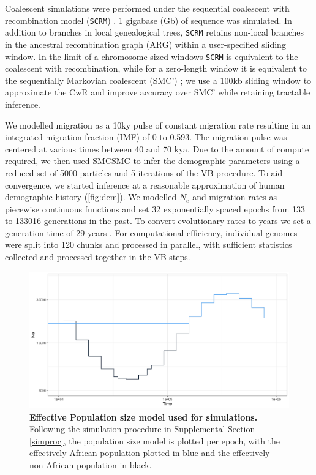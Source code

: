Coalescent simulations were performed under the sequential coalescent with recombination model ({\tt SCRM}) \cite{Staab2015}. 1 gigabase (Gb) of sequence was simulated.  In addition to branches in local genealogical trees, {\tt SCRM} retains non-local branches in the ancestral recombination graph (ARG) within a user-specified sliding window.  In the limit of a chromosome-sized windows {\tt SCRM} is equivalent to the coalescent with recombination, while for a zero-length window it is equivalent to the sequentially Markovian coalescent (SMC') \cite{McVean2005,Marjoram2006}; we use a $100$kb sliding window to approximate the CwR and improve accuracy over SMC' while retaining tractable inference.

We modelled migration as a 10ky pulse of constant migration rate resulting in an integrated migration fraction (IMF) of 0 to 0.593. The migration pulse was centered at various times between 40 and 70 kya.  Due to the amount of compute required, we then used SMCSMC to infer the demographic parameters using a reduced set of 5000 particles and 5 iterations of the VB procedure. To aid convergence, we started inference at a reasonable approximation of human demographic history (\autoref{fig:dem}). We modelled $N_e$ and migration rates as piecewise continuous functions and set 32 exponentially spaced epochs from 133 to 133016 generations in the past. To convert evolutionary rates to years we set a generation time of 29 years \cite{Fenner2005}.  For computational efficiency, individual genomes were split into 120 chunks and processed in parallel, with sufficient statistics collected and processed together in the VB steps.


\begin{figure}[hb]
  \centering
  \includegraphics[width = 0.5\linewidth]{plot/demographic_model.png}
  \caption{{\bf Effective Population size model used for simulations.} Following the simulation procedure in Supplemental Section \ref{simproc}, the population size model is plotted per epoch, with the effectively African population plotted in blue and the effectively non-African population in black. }
  \label{fig:dem}
\end{figure}

